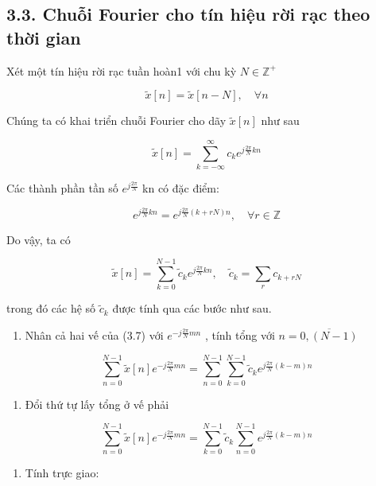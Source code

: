 \documentclass[
  10
]{article}
\providecommand{\tightlist}{%
  \setlength{\itemsep}{0pt}\setlength{\parskip}{0pt}}
\begin{document}
\subsection{3.3. Chuỗi Fourier cho tín hiệu rời rạc theo thời
gian}\label{chuux1ed7i-fourier-cho-tuxedn-hiux1ec7u-rux1eddi-rux1ea1c-theo-thux1eddi-gian}

Xét một tín hiệu rời rạc tuần hoàn1 với chu kỳ
\(N \in \mathbb { Z } ^ { + }\)

\[
\tilde {x} [ n ] = \tilde {x} [ n - N ], \quad \forall n
\]

Chúng ta có khai triển chuỗi Fourier cho dãy \({ \tilde { x } } [ n ]\)
như sau

\[
\tilde {x} [ n ] = \sum_ {k = - \infty} ^ {\infty} c _ {k} e ^ {j \frac {2 \pi}{N} k n}
\]

Các thành phần tần số \(e ^ { j { \frac { 2 \pi } { N } } }\) kn có đặc
điểm:

\[
e ^ {j \frac {2 \pi}{N} k n} = e ^ {j \frac {2 \pi}{N} (k + r N) n}, \quad \forall r \in \mathbb {Z}
\]

Do vậy, ta có

\[
\tilde {x} [ n ] = \sum_ {k = 0} ^ {N - 1} \tilde {c} _ {k} e ^ {j \frac {2 \pi}{N} k n}, \quad \tilde {c} _ {k} = \sum_ {r} c _ {k + r N}\tag{3.7}
\]

trong đó các hệ số \(\tilde { c } _ { k }\) được tính qua các bước như
sau.

\begin{enumerate}
\def\labelenumi{(\roman{enumi})}
\tightlist
\item
  Nhân cả hai vế của (3.7) với
  \(e ^ { - j { \frac { 2 \pi } { N } } m n }\) , tính tổng với
  \(n = \overline { { 0 , ( N - 1 ) } }\)
\end{enumerate}

\[
\sum_ {n = 0} ^ {N - 1} \tilde {x} [ n ] e ^ {- j \frac {2 \pi}{N} m n} = \sum_ {n = 0} ^ {N - 1} \sum_ {k = 0} ^ {N - 1} \tilde {c} _ {k} e ^ {j \frac {2 \pi}{N} (k - m) n}
\]

\begin{enumerate}
\def\labelenumi{(\roman{enumi})}
\setcounter{enumi}{1}
\tightlist
\item
  Đổi thứ tự lấy tổng ở vế phải
\end{enumerate}

\[
\sum_ {n = 0} ^ {N - 1} \tilde {x} [ n ] e ^ {- j \frac {2 \pi}{N} m n} = \sum_ {k = 0} ^ {N - 1} \tilde {c} _ {k} \sum_ {n = 0} ^ {N - 1} e ^ {j \frac {2 \pi}{N} (k - m) n}
\]

\begin{enumerate}
\def\labelenumi{(\roman{enumi})}
\setcounter{enumi}{2}
\tightlist
\item
  Tính trực giao:
\end{enumerate}
\end{document}
